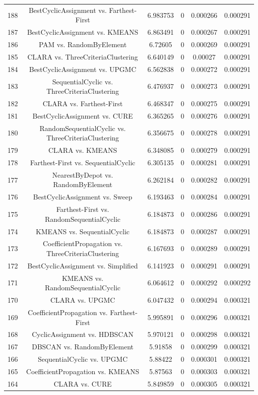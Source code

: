\documentclass[a4paper,10pt]{article}
\begin{document}
\begin{landscape}
\begin{table}[!htp]
\begin{tabular}{cccccc}
188&BestCyclicAssignment vs. Farthest-First&6.983753&0&0.000266&0.000291\\
187&BestCyclicAssignment vs. KMEANS&6.863491&0&0.000267&0.000291\\
186&PAM vs. RandomByElement&6.72605&0&0.000269&0.000291\\
185&CLARA vs. ThreeCriteriaClustering&6.640149&0&0.00027&0.000291\\
184&BestCyclicAssignment vs. UPGMC&6.562838&0&0.000272&0.000291\\
183&SequentialCyclic vs. ThreeCriteriaClustering&6.476937&0&0.000273&0.000291\\
182&CLARA vs. Farthest-First&6.468347&0&0.000275&0.000291\\
181&BestCyclicAssignment vs. CURE&6.365265&0&0.000276&0.000291\\
180&RandomSequentialCyclic vs. ThreeCriteriaClustering&6.356675&0&0.000278&0.000291\\
179&CLARA vs. KMEANS&6.348085&0&0.000279&0.000291\\
178&Farthest-First vs. SequentialCyclic&6.305135&0&0.000281&0.000291\\
177&NearestByDepot vs. RandomByElement&6.262184&0&0.000282&0.000291\\
176&BestCyclicAssignment vs. Sweep&6.193463&0&0.000284&0.000291\\
175&Farthest-First vs. RandomSequentialCyclic&6.184873&0&0.000286&0.000291\\
174&KMEANS vs. SequentialCyclic&6.184873&0&0.000287&0.000291\\
173&CoefficientPropagation vs. ThreeCriteriaClustering&6.167693&0&0.000289&0.000291\\
172&BestCyclicAssignment vs. Simplified&6.141923&0&0.000291&0.000291\\
171&KMEANS vs. RandomSequentialCyclic&6.064612&0&0.000292&0.000292\\
170&CLARA vs. UPGMC&6.047432&0&0.000294&0.000321\\
169&CoefficientPropagation vs. Farthest-First&5.995891&0&0.000296&0.000321\\
168&CyclicAssignment vs. HDBSCAN&5.970121&0&0.000298&0.000321\\
167&DBSCAN vs. RandomByElement&5.91858&0&0.000299&0.000321\\
166&SequentialCyclic vs. UPGMC&5.88422&0&0.000301&0.000321\\
165&CoefficientPropagation vs. KMEANS&5.87563&0&0.000303&0.000321\\
164&CLARA vs. CURE&5.849859&0&0.000305&0.000321\\

\end{tabular}
\end{table}
\end{landscape}
\end{document}
